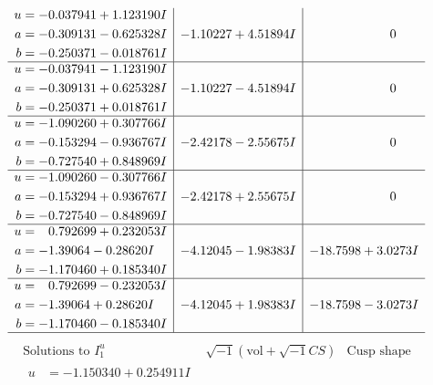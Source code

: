 \documentclass[1p]{elsarticle_modified}
\theoremstyle{definition}
\newcommand{\I}{\sqrt{-1}}
\begin{document}
$$\begin{array}{c|c|c}
\begin{aligned}
u &= -0.037941 + 1.123190 I \\
a &= -0.309131 - 0.625328 I \\
b &= -0.250371 - 0.018761 I\end{aligned}
 & -1.10227 + 4.51894 I & \phantom{-0.000000 } 0 \\ \hline\begin{aligned}
u &= -0.037941 - 1.123190 I \\
a &= -0.309131 + 0.625328 I \\
b &= -0.250371 + 0.018761 I\end{aligned}
 & -1.10227 - 4.51894 I & \phantom{-0.000000 } 0 \\ \hline\begin{aligned}
u &= -1.090260 + 0.307766 I \\
a &= -0.153294 - 0.936767 I \\
b &= -0.727540 + 0.848969 I\end{aligned}
 & -2.42178 - 2.55675 I & \phantom{-0.000000 } 0 \\ \hline\begin{aligned}
u &= -1.090260 - 0.307766 I \\
a &= -0.153294 + 0.936767 I \\
b &= -0.727540 - 0.848969 I\end{aligned}
 & -2.42178 + 2.55675 I & \phantom{-0.000000 } 0 \\ \hline\begin{aligned}
u &= \phantom{-}0.792699 + 0.232053 I \\
a &= -1.39064 - 0.28620 I \\
b &= -1.170460 + 0.185340 I\end{aligned}
 & -4.12045 - 1.98383 I & -18.7598 + 3.0273 I \\ \hline\begin{aligned}
u &= \phantom{-}0.792699 - 0.232053 I \\
a &= -1.39064 + 0.28620 I \\
b &= -1.170460 - 0.185340 I\end{aligned}
 & -4.12045 + 1.98383 I & -18.7598 - 3.0273 I\\
 \hline 
 \end{array}$$\newpage$$\begin{array}{c|c|c}  
\text{Solutions to }I^u_{1}& \I (\text{vol} + \sqrt{-1}CS) & \text{Cusp shape}\\
 \hline 
\begin{aligned}
u &= -1.150340 + 0.254911 I \\

\end{aligned}
\end{array}$$
\end{document}
